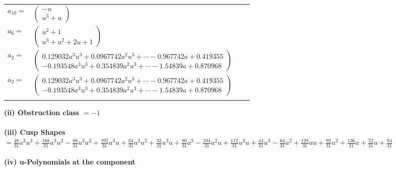 \documentclass[1p]{elsarticle_modified}
\theoremstyle{definition}
\begin{document}
\begin{tabular}{m{7pt} m{180pt} m{7pt} m{180pt} }
\flushright $a_{10}=$&$\begin{pmatrix}- u\\u^3+u\end{pmatrix}$ \\
\flushright $a_{6}=$&$\begin{pmatrix}u^2+1\\u^3+u^2+2 u+1\end{pmatrix}$ \\
\flushright $a_{2}=$&$\begin{pmatrix}0.129032 a^{3} u^{3}+0.0967742 a^{2} u^{3}+\cdots-0.967742 a+0.419355\\-0.193548 a^{3} u^{3}+0.354839 a^{2} u^{3}+\cdots-1.54839 a+0.870968\end{pmatrix}$\\ \flushright $a_{2}=$&$\begin{pmatrix}0.129032 a^{3} u^{3}+0.0967742 a^{2} u^{3}+\cdots-0.967742 a+0.419355\\-0.193548 a^{3} u^{3}+0.354839 a^{2} u^{3}+\cdots-1.54839 a+0.870968\end{pmatrix}$\\&\end{tabular}
\flushleft \textbf{(ii) Obstruction class $= -1$}\\~\\
\flushleft \textbf{(iii) Cusp Shapes $= \frac{48}{31} a^3 u^3+\frac{168}{31} a^3 u^2-\frac{88}{31} u^3 a^2+\frac{192}{31} a^3 u+\frac{64}{31} a^2 u^2+\frac{32}{31} u^3 a+\frac{80}{31} a^3-\frac{104}{31} a^2 u+\frac{112}{31} u^2 a+\frac{44}{31} u^3-\frac{64}{31} a^2+\frac{128}{31} a u+\frac{92}{31} u^2+\frac{136}{31} a+\frac{52}{31} u+\frac{94}{31}$}\\~\\
\newpage\renewcommand{\arraystretch}{1}
\flushleft \textbf{(iv) u-Polynomials at the component}\newline \\
\end{document}
